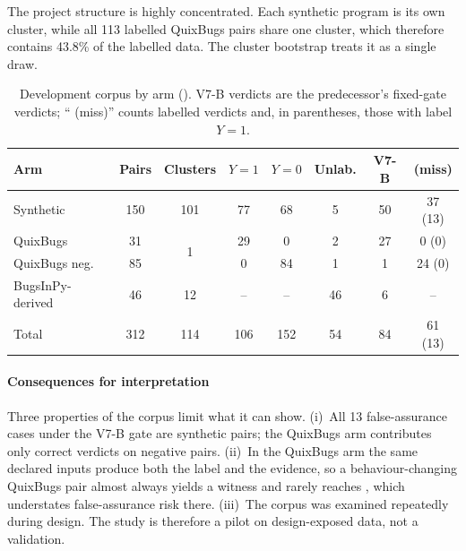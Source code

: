 The project structure is highly concentrated. Each synthetic program is its own cluster, while all 113 labelled QuixBugs pairs share one cluster, which therefore contains 43.8\% of the labelled data. The cluster bootstrap treats it as a single draw.

\begin{table}[!t]
\caption{Development corpus by arm (). V7-B verdicts are the predecessor's fixed-gate verdicts; ``\NDO{} (miss)'' counts labelled \NDO{} verdicts and, in parentheses, those with label $Y{=}1$.}
\label{tab:corpus}
\centering
\scriptsize
\setlength{\tabcolsep}{2.5pt}
\begin{tabular}{|l|c|c|c|c|c|c|c|}
\hline
Arm & Pairs & Clusters & $Y{=}1$ & $Y{=}0$ & Unlab. & V7-B \DIV{} & \NDO{} (miss) \\
\hline
Synthetic & 150 & 101 & 77 & 68 & 5 & 50 & 37 (13) \\
QuixBugs & 31 & \multirow{2}{*}{1} & 29 & 0 & 2 & 27 & 0 (0) \\
QuixBugs neg. & 85 & & 0 & 84 & 1 & 1 & 24 (0) \\
BugsInPy-derived & 46 & 12 & -- & -- & 46 & 6 & -- \\
\hline
Total & 312 & 114 & 106 & 152 & 54 & 84 & 61 (13) \\
\hline
\end{tabular}
\end{table}

\paragraph*{Consequences for interpretation} Three properties of the corpus limit what it can show. (i)~All 13 false-assurance cases under the V7-B gate are synthetic pairs; the QuixBugs arm contributes only correct \NDO{} verdicts on negative pairs. (ii)~In the QuixBugs arm the same declared inputs produce both the label and the evidence, so a behaviour-changing QuixBugs pair almost always yields a witness and rarely reaches \NDO{}, which understates false-assurance risk there. (iii)~The corpus was examined repeatedly during design. The study is therefore a pilot on design-exposed data, not a validation.

